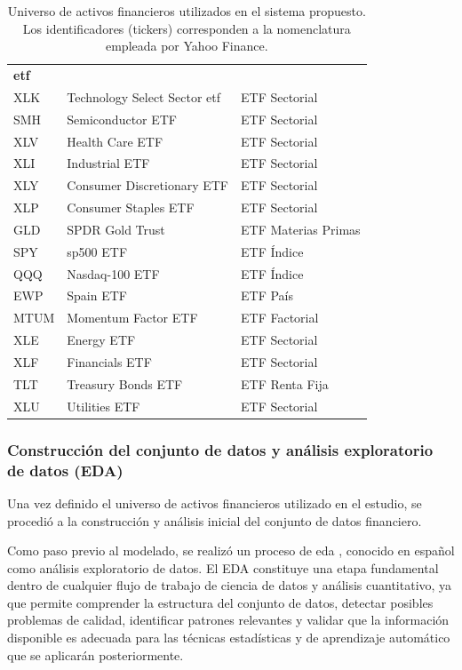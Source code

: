 \documentclass[
]{article}
\begin{document}
\begin{table}[H]
\begin{tabular}{lll}
\midrule
\multicolumn{3}{l}{\textbf{\gls{etf}}} \\
XLK     & Technology Select Sector \gls{etf}   & ETF Sectorial \\
SMH     & Semiconductor ETF              & ETF Sectorial \\
XLV     & Health Care ETF                & ETF Sectorial \\
XLI     & Industrial ETF                 & ETF Sectorial \\
XLY     & Consumer Discretionary ETF     & ETF Sectorial \\
XLP     & Consumer Staples ETF           & ETF Sectorial \\
GLD     & SPDR Gold Trust                & ETF Materias Primas \\
SPY     & \gls{sp500} ETF                  & ETF Índice \\
QQQ     & Nasdaq-100 ETF                & ETF Índice \\
EWP     & Spain ETF                     & ETF País \\
MTUM    & Momentum Factor ETF           & ETF Factorial \\
XLE     & Energy ETF                    & ETF Sectorial \\
XLF     & Financials ETF                & ETF Sectorial \\
TLT     & Treasury Bonds ETF            & ETF Renta Fija \\
XLU     & Utilities ETF                 & ETF Sectorial \\

\bottomrule
\end{tabular}
\caption{Universo de activos financieros utilizados en el sistema propuesto. Los identificadores (tickers) corresponden a la nomenclatura empleada por Yahoo Finance.}
\label{tab:assets}
\end{table}

\subsubsection{Construcción del conjunto de datos y análisis exploratorio de datos (EDA)}

Una vez definido el universo de activos financieros utilizado en el estudio, se procedió a la construcción y análisis inicial del conjunto de datos financiero.

Como paso previo al modelado, se realizó un proceso de \gls{eda} \parencite{tukey1977eda}, conocido en español como análisis exploratorio de datos. El EDA constituye una etapa fundamental dentro de cualquier flujo de trabajo de ciencia de datos y análisis cuantitativo, ya que permite comprender la estructura del conjunto de datos, detectar posibles problemas de calidad, identificar patrones relevantes y validar que la información disponible es adecuada para las técnicas estadísticas y de aprendizaje automático que se aplicarán posteriormente.
\end{document}

